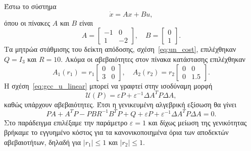 Έστω το σύστημα
\[
    \dot{x} = Ax + Bu,
\]
όπου οι πίνακες \( A \) και \( B \) είναι
\[
    A =
    \begin{bmatrix}
        -1 & 0 \\
        1 & -2
    \end{bmatrix}, \quad
    B = \begin{bmatrix}0 \\ 1\end{bmatrix}.
\]
Τα μητρώα στάθμισης του δείκτη απόδοσης, σχέση~\eqref{eq:un_cost}, επιλέχθηκαν
\( Q = I_3 \) και \( R = 10 \). Ακόμα οι αβεβαιότητες στον πίνακα κατάστασης
επιλέχθηκαν
\[
    A_1(r_1) =
    r_1\begin{bmatrix}
        0 & 0 \\
        3 & 0
    \end{bmatrix}, \quad
    A_2(r_2) =
    r_2\begin{bmatrix}
        0 & 0 \\
        0 & 1.5
    \end{bmatrix}.
\]
Η σχέση~\eqref{eq:gcc_u_linear} μπορεί να γραφτεί στην ισοδύναμη μορφή
\[
    \mathcal{U}(P) = \varepsilon P + \varepsilon^{-1}\Delta A^{T}P\Delta A,
\]
καθώς υπάρχουν αβεβαιότητες. Έτσι η γενικευμένη αλγεβρική εξίσωση 
θα γίνει
\begin{equation}\label{eq:un_gare_linear}
    PA + A^{T}P - PBR^{-1}B^{T}P + Q + \varepsilon P +
    \varepsilon^{-1}\Delta A^{T}P\Delta A = 0.
\end{equation}
Στο παράδειγμα επιλέξαμε την παράμετρο
\( \varepsilon = 1 \) και δίχως μείωση της γενικότητας βρήκαμε το εγγυημένο
κόστος για τα κανονικοποιημένα όρια των αποδεκτών αβεβαιοτήτων, δηλαδή για
\( |r_1| \leq 1 \) και \( |r_2| \leq 1 \).


